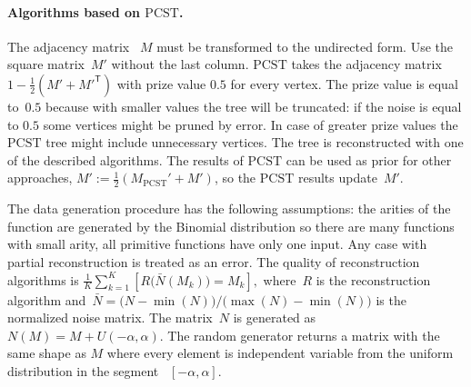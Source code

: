 \documentclass[12pt]{article}
\begin{document}
\begin{table}[!htp]
    \caption{Quality of reconstruction algorithms with uniform noise near to $0.5$}
    \label{table:main_algs_local}
\end{table}

\paragraph{Algorithms based on $\text{PCST}$.}
The adjacency matrix~ $M$ must be transformed to the undirected form. Use the square matrix~$M'$ without the last column.  $\text{PCST}$ takes the adjacency matrix~$1 - \frac{1}{2}(M' + M'^{\mathsf{T}})$ with prize value $0.5$ for every vertex. %
The prize value is equal to~$0.5$ because with smaller values the tree will be truncated: if the noise is equal to $0.5$ some vertices might be pruned by error. In case of greater prize values the $\text{PCST}$ tree might include unnecessary vertices. The tree is reconstructed with one of the described algorithms. The results of $\text{PCST}$ can be used as prior for other approaches, $ M':=\frac{1}{2}(M_\text{PCST}' + M')$,
so the $\text{PCST}$ results update~$M'$.

The data generation procedure has the following assumptions: the arities of the function are generated by the Binomial distribution so there are many functions with small arity, all primitive functions have only one input. Any case with partial reconstruction is treated as an error. The quality of reconstruction algorithms is
$\frac{1}{K}\sum_{k=1}^K[R\bigl(\bar{N}(M_k)\bigr)=M_k],$%
where~$R$ is the reconstruction algorithm and~$\bar{N}=\bigl(N-\min(N)\bigr)/\bigl(\max(N)-\min(N)\bigr)$ is the normalized noise matrix. The matrix~$N$ is generated as~$N(M)=M+U(-\alpha,\alpha)$.
The random generator returns a matrix with the same shape as $M$ where every element is independent variable from the uniform distribution in the segment~ $[-\alpha,\alpha]$.
\end{document}
